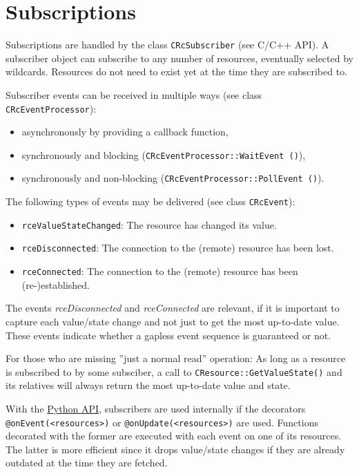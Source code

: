 \documentclass[12pt,english,parskip=half]{scrreprt}
\newcommand{\projecturl}{}
\newcommand{\docref}[2]{\href{\projecturl#1}{#2}}
\newcommand{\refapipython}{\docref{home2l-api_python/index.html}{Python API}}
\begin{document}
\section{Subscriptions}
\label{sec:resources-subscriptions}


Subscriptions are handled by the class \texttt{CRcSubscriber} (see C/C++
API). A subscriber object can subscribe to any number of resources,
eventually selected by wildcards. Resources do not need to exist yet at
the time they are subscribed to.

Subscriber events can be received in multiple ways (see class \texttt{CRcEventProcessor}):

\begin{itemize}
\item
  asynchronously by providing a callback function,
\item
  synchronously and blocking (\texttt{CRcEventProcessor::WaitEvent ()}),
\item
  synchronously and non-blocking (\texttt{CRcEventProcessor::PollEvent ()}).
\end{itemize}

The following types of events may be delivered (see class
\texttt{CRcEvent}):

\begin{itemize}
\item
  \texttt{rceValueStateChanged}: The resource has changed its value.
\item
  \texttt{rceDisconnected}: The connection to the (remote) resource
  has been lost.
\item
  \texttt{rceConnected}: The connection to the (remote) resource has
  been (re-)established.
\end{itemize}

The events \emph{rceDisconnected} and \emph{rceConnected} are relevant,
 if it is important to capture each value/state change and not
just to get the most up-to-date value. These events indicate whether a
gapless event sequence is guaranteed or not.

For those who are missing ''just a normal read'' operation:
As long as a resource is subscribed to by some subsciber, a call to
\texttt{CResource::GetValueState()} and its relatives will always
return the most up-to-date value and state.

With the \refapipython{}, subscribers are used internally if the decorators
\texttt{@onEvent(<resources>)} or \texttt{@onUpdate(<resources>)}
are used. Functions decorated with the former are executed with each
event on one of its resources. The latter is more efficient since it
drops value/state changes if they are already outdated at the time they
are fetched.
\end{document}
